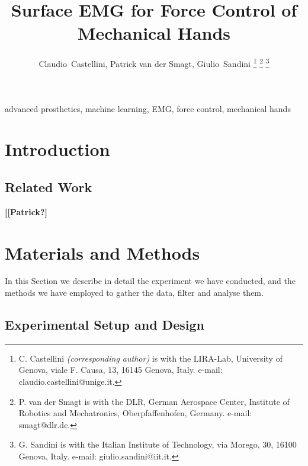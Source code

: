 \documentclass[journal]{IEEEtran}
\begin{document}
\title{Surface EMG for Force Control of\\Mechanical Hands}

\author{Claudio~Castellini, Patrick van der Smagt, Giulio~Sandini
\thanks{C. Castellini \emph{(corresponding author)}
  is with the LIRA-Lab, University of Genova,
  viale F. Causa, 13, 16145 Genova, Italy.
  e-mail: claudio.castellini@unige.it.}%
\thanks{P. van der Smagt is with the DLR, German Aerospace Center,
  Institute of Robotics and Mechatronics, Oberpfaffenhofen, Germany.
  e-mail: smagt@dlr.de.}%
\thanks{G. Sandini is with the Italian Institute of Technology,
  via Morego, 30, 16100 Genova, Italy.
  e-mail: giulio.sandini@iit.it.}%
}

\maketitle

\begin{abstract}
  
\end{abstract}

\begin{IEEEkeywords}
advanced prosthetics, machine learning, EMG, force control, mechanical hands
\end{IEEEkeywords}

\IEEEpeerreviewmaketitle

\section{Introduction}
\label{sec:introduction}


\subsection{Related Work}
\label{subsec:relatedwork}


\textbf{[[Patrick?]}

\section{Materials and Methods}
\label{sec:m&ms}

In this Section we describe in detail the experiment we have
conducted, and the methods we have employed to gather the data, filter
and analyse them.

\subsection{Experimental Setup and Design}
\label{subsec:setup}

\end{document}
